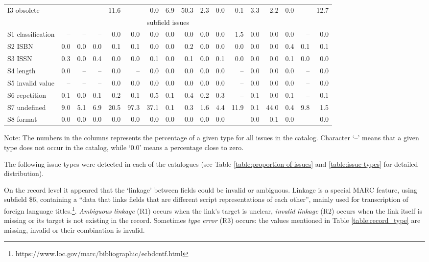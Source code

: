 {\begin{landscape}
\begin{table}
\begin{minipage}{\columnwidth}
\begin{center}
\begin{tabular}{lrrrrrrrrrrrrrrrr}
I3 obsolete & -- & -- & -- & 11.6 & -- & 0.0 & 6.9 & 50.3 & 2.3 & 0.0 & 0.1 & 3.3 & 2.2 & 0.0 & -- & 12.7 \\
\multicolumn{17}{c}{subfield issues} \\
S1 classification & -- & -- & -- & 0.0 & 0.0 & 0.0 & 0.0 & 0.0 & 0.0 & 0.0 & 1.5 & 0.0 & 0.0 & 0.0 & -- & 0.0 \\
S2 ISBN & 0.0 & 0.0 & 0.0 & 0.1 & 0.1 & 0.0 & 0.0 & 0.2 & 0.0 & 0.0 & 0.0 & 0.0 & 0.0 & 0.4 & 0.1 & 0.1 \\
S3 ISSN & 0.3 & 0.0 & 0.4 & 0.0 & 0.0 & 0.1 & 0.0 & 0.1 & 0.0 & 0.1 & 0.0 & 0.0 & 0.0 & 0.1 & 0.0 & 0.0 \\
S4 length & 0.0 & -- & -- & 0.0 & -- & 0.0 & 0.0 & 0.0 & 0.0 & 0.0 & -- & 0.0 & 0.0 & 0.0 & -- & 0.0 \\
S5 invalid value & -- & -- & -- & 0.0 & 0.0 & 0.0 & 0.0 & 0.0 & 0.0 & 0.0 & -- & 0.0 & 0.0 & 0.0 & -- & 0.0 \\
S6 repetition & 0.1 & 0.0 & 0.1 & 0.2 & 0.1 & 0.5 & 0.1 & 0.4 & 0.2 & 0.3 & -- & 0.1 & 0.0 & 0.1 & -- & 0.1 \\
S7 undefined & 9.0 & 5.1 & 6.9 & 20.5 & 97.3 & 37.1 & 0.1 & 0.3 & 1.6 & 4.4 & 11.9 & 0.1 & 44.0 & 0.4 & 9.8 & 1.5 \\
S8 format & 0.0 & 0.0 & 0.0 & 0.0 & 0.0 & 0.0 & 0.0 & 0.0 & 0.0 & 0.0 & -- & 0.0 & 0.1 & 0.0 & -- & 0.0 \\
\bottomrule
\end{tabular}
\end{center}
\footnotesize
Note: The numbers in the columns represents the percentage of a given type for all issues in the catalog. Character `--' means that a given type does not occur in the catalog, while `0.0' means a percentage close to zero.
\end{minipage}
\end{table}
    \end{landscape}
    \clearpage%
}

The following issue types were detected in each of the catalogues (see Table \ref{table:proportion-of-issues} and \ref{table:issue-types} for detailed distribution).

On the record level it appeared that the `linkage' between fields could be invalid or ambiguous. Linkage is a special MARC feature, using subfield \$6, containing  a ``data that links fields that are different script representations of each other'', mainly used for transcription of foreign language titles.\footnote{https://www.loc.gov/marc/bibliographic/ecbdcntf.html}. \emph{Ambiguous linkage} (R1) occurs when the link's target is unclear, \emph{invalid linkage} (R2) occurs when the link itself is missing or its target is not existing in the record. Sometimes \emph{type error} (R3) occurs: the values mentioned in Table \ref{table:record_type} are missing, invalid or their combination is invalid.

